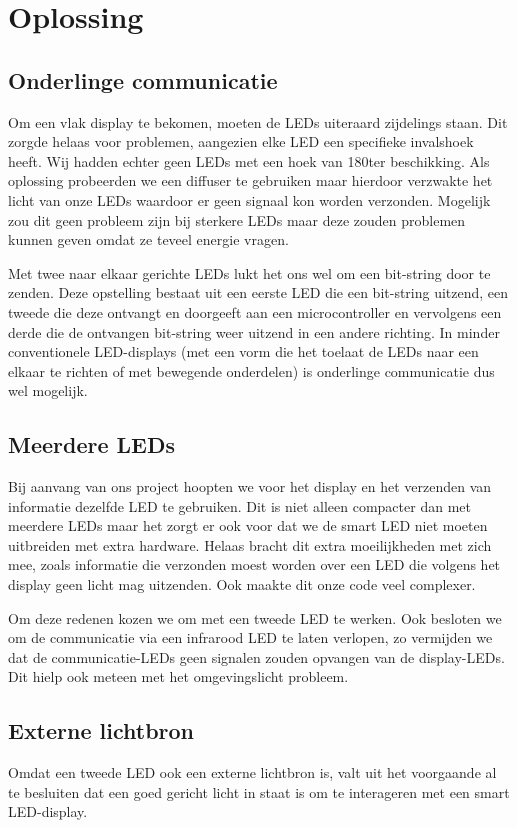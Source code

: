 \documentclass{article}
\begin{document}
\section{Oplossing}

\subsection{Onderlinge communicatie}
Om een vlak display te bekomen, moeten de LEDs uiteraard zijdelings staan. Dit zorgde helaas voor problemen, aangezien elke LED een specifieke invalshoek heeft. Wij hadden echter geen LEDs met een hoek van 180\degree ter beschikking. Als oplossing probeerden we een diffuser te gebruiken maar hierdoor verzwakte het licht van onze LEDs waardoor er geen signaal kon worden verzonden. Mogelijk zou dit geen probleem zijn bij sterkere LEDs maar deze zouden problemen kunnen geven omdat ze teveel energie vragen. 

Met twee naar elkaar gerichte LEDs lukt het ons wel om een bit-string door te zenden. Deze opstelling bestaat uit een eerste LED die een bit-string uitzend, een tweede die deze ontvangt en doorgeeft aan een microcontroller en vervolgens een derde die de ontvangen bit-string weer uitzend in een andere richting. In minder conventionele LED-displays (met een vorm die het toelaat de LEDs naar een elkaar te richten of met bewegende onderdelen) is onderlinge communicatie dus wel mogelijk.

\subsection{Meerdere LEDs}
Bij aanvang van ons project hoopten we voor het display en het verzenden van informatie dezelfde LED te gebruiken. Dit is niet alleen compacter dan met meerdere LEDs maar het zorgt er ook voor dat we de smart LED niet moeten uitbreiden met extra hardware. Helaas bracht dit extra moeilijkheden met zich mee, zoals informatie die verzonden moest worden over een LED die volgens het display geen licht mag uitzenden. Ook maakte dit onze code veel complexer. 

Om deze redenen kozen we om met een tweede LED te werken. Ook besloten we om de communicatie via een infrarood LED te laten verlopen, zo vermijden we dat de communicatie-LEDs geen signalen zouden opvangen van de display-LEDs. Dit hielp ook meteen met het omgevingslicht probleem. 

\subsection{Externe lichtbron}
Omdat een tweede LED ook een externe lichtbron is, valt uit het voorgaande al te besluiten dat een goed gericht licht in staat is om te interageren met een smart LED-display. 
\end{document}
